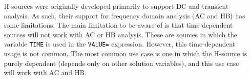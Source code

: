\begin{Device}
H-sources were originally developed primarily to support DC and transient analysis.  
As such, their support for frequency domain analysis (AC and HB) has some limitations.  
The main limitation to be aware of is that time-dependent sources will not work with AC or HB analysis.  
These are sources in which the variable \texttt{TIME} is used in the \texttt{VALUE=} expression. 
However, this time-dependent usage is not common.  The most 
common use case is one in which the H-source is purely dependent (depends only 
on other solution variables), and this use case will work with AC and HB.  

\end{Device}

